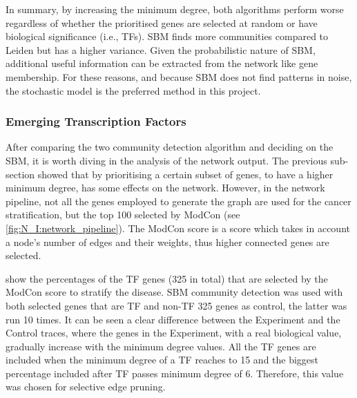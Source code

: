 In summary, by increasing the minimum degree, both algorithms perform worse regardless of whether the prioritised genes are selected at random or have biological significance (i.e., TFs). SBM finds more communities compared to Leiden but has a higher variance. Given the probabilistic nature of SBM, additional useful information can be extracted from the network like gene membership. For these reasons, and because SBM does not find patterns in noise, the stochastic model is the preferred method in this project.


\subsubsection{Emerging Transcription Factors} \label{s:N_I:sel_tfs}

After comparing the two community detection algorithm and deciding on the SBM, it is worth diving in the analysis of the network output. The previous sub-section showed that by prioritising a certain subset of genes, to have a higher minimum degree, has some effects on the network. However, in the network pipeline, not all the genes employed to generate the graph are used for the cancer stratification, but the top 100 selected by ModCon (see \cref{fig:N_I:network_pipeline}). The ModCon score is a score which takes in account a node's number of edges and their weights, thus higher connected genes are selected.

 show the percentages of the TF genes (325 in total) that are selected by the ModCon score to stratify the disease. SBM community detection was used with both selected genes that are TF and non-TF 325 genes as control, the latter was run 10 times. It can be seen a clear difference between the Experiment and the Control traces, where the genes in the Experiment, with a real biological value, gradually increase with the minimum degree values. All the TF genes are included when the minimum degree of a TF reaches to 15 and the biggest percentage included after TF passes minimum degree of 6. Therefore, this value was chosen for selective edge pruning.


